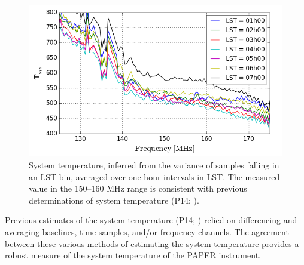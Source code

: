 \documentclass[twocolumn,numberedappendix]{emulateapj} \shorttitle{PSA64}
\begin{document}
\begin{figure}[b!]\centering
\includegraphics[width=\columnwidth]{plots/tsys.png}
\caption{System temperature, inferred from the variance of samples falling 
in an LST bin, averaged over one-hour intervals in LST.  The measured value
in the 150--160 MHz range is consistent with previous determinations of
system temperature (P14; \citealt{jacobs_et_al2014}).
}\label{fig:tsys}
\end{figure}
Previous estimates of the system temperature
(P14; \citealt{jacobs_et_al2014}) relied on differencing and averaging
baselines, time samples, and/or frequency channels. The agreement between these
various methods of estimating the system temperature provides a robust measure
of the system temperature of the PAPER instrument. 
\end{document}
